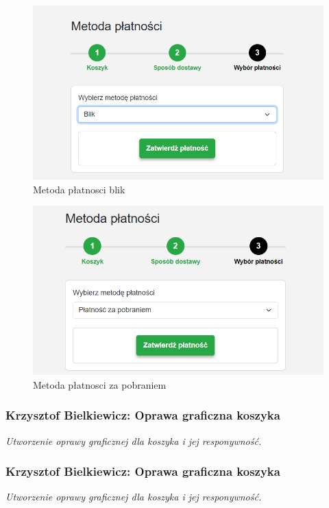 \documentclass[12pt,a4paper,oneside]{article}
\theoremstyle{definition}
\numberwithin{equation}{section}
\begin{document}
\begin{figure}[H]
    \centering
    \includegraphics[width=0.8\columnwidth]{images/krzysztofBImages/cart/metody-płatności-blik.png}
    \caption{Metoda płatnosci blik}
    \label{płatność-blik}
\end{figure}

\begin{figure}[H]
    \centering
    \includegraphics[width=0.8\columnwidth]{images/krzysztofBImages/cart/metody-płatności-za-pobraniem.png}
    \caption{Metoda płatnosci za pobraniem}
    \label{płatność-zapobraniem}
\end{figure}

\subsubsection{Krzysztof Bielkiewicz: Oprawa graficzna koszyka}
\label{1.3.11}
\textit{Utworzenie oprawy graficznej dla koszyka i jej responywność.}

\subsubsection{Krzysztof Bielkiewicz: Oprawa graficzna koszyka}
\label{1.3.12}
\textit{Utworzenie oprawy graficznej dla koszyka i jej responywność.}
\end{document}
